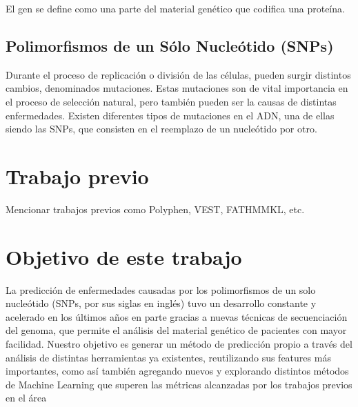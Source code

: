 El gen se define como una parte del material genético que codifica una proteína. 


\subsection{Polimorfismos de un Sólo Nucleótido (SNPs)}

Durante el proceso de replicación o división de las células, pueden surgir distintos cambios, denominados mutaciones. Estas mutaciones son de vital importancia en el proceso de selección natural, pero también pueden ser la causas de distintas enfermedades. Existen diferentes tipos de mutaciones en el ADN, una de ellas siendo las SNPs, que consisten en el reemplazo de un nucleótido por otro.


\section{Trabajo previo}

Mencionar trabajos previos como Polyphen, VEST, FATHMMKL, etc.

\section{Objetivo de este trabajo}

La predicción de enfermedades causadas por los polimorfismos de un solo nucleótido (SNPs, por sus siglas en inglés) tuvo un desarrollo constante y acelerado en los últimos años en parte gracias a nuevas técnicas de secuenciación del genoma, que permite el análisis del material genético de pacientes con mayor facilidad. Nuestro objetivo es generar un método de predicción propio a través del análisis de distintas herramientas ya existentes, reutilizando sus features más importantes, como así también agregando nuevos y explorando distintos métodos de Machine Learning que superen las métricas alcanzadas por los trabajos previos en el área



